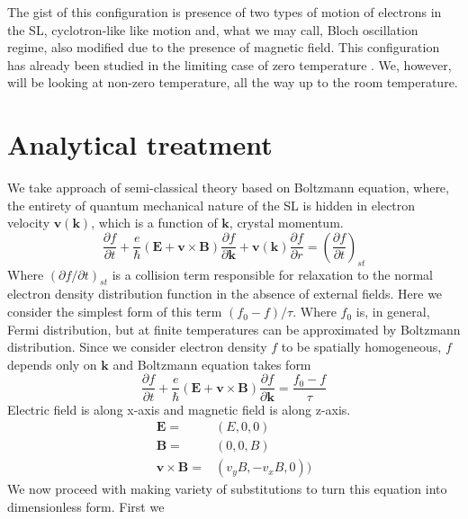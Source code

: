 \documentclass[40pt,letterpaper,physrev]{article}
\begin{document}
    The gist of this configuration is presence of two types of motion of electrons in the SL, cyclotron-like like motion
    and, what we may call, Bloch oscillation regime, also modified due to the presence of magnetic field. This
    configuration has already been studied in the limiting case of zero temperature \cite{PhysRevLett.103.117401}. We,
    however, will be looking at non-zero temperature, all the way up to the room temperature.
  \section{Analytical treatment}
    We take approach of semi-classical theory based on Boltzmann equation, where, the entirety of quantum 
    mechanical nature of the SL is hidden in electron velocity $\mathbf{v}(\mathbf{k})$, which is a function of $
    \mathbf{k}$, crystal momentum. 
    \begin{equation}\label{eq:boltzmann}
     \frac{\partial f}{\partial t}+
     \frac{e}{\hbar}\left ( \mathbf{E} + \mathbf{v}\times\mathbf{B} \right ) \frac{\partial f}{\partial\mathbf{k}}+
     \mathbf{v}(\mathbf{k})\frac{\partial f}{\partial r} = \left ( \frac{\partial f}{\partial t} \right )_{st}
    \end{equation}
    Where $\left ( \partial f/\partial t \right )_{st}$ is a collision term responsible for relaxation to the
    normal electron density distribution function in the absence of external fields. Here we consider the simplest
    form of this term $(f_0-f)/\tau$. Where $f_0$ is, in general, Fermi distribution, but at finite temperatures
    can be approximated by Boltzmann distribution.
    Since we consider electron density $f$ to be spatially homogeneous, $f$ depends only on $\mathbf{k}$ and 
    Boltzmann equation takes form
    \begin{equation}\label{eq:boltzmann_homo}
     \frac{\partial f}{\partial t}+
     \frac{e}{\hbar}\left ( \mathbf{E} + \mathbf{v}\times\mathbf{B} \right ) \frac{\partial f}{\partial\mathbf{k}}
     = \frac{f_0 - f}{\tau}
    \end{equation}
    Electric field is along x-axis and magnetic field is along z-axis.
    \begin{align}
     \mathbf{E}=&(E,0,0) \\
     \mathbf{B}=&(0,0,B) \\
     \mathbf{v}\times\mathbf{B}=&(v_y B, -v_x B, 0))
    \end{align}
    We now proceed with making variety of substitutions to turn this equation into dimensionless form. First we
\end{document}
